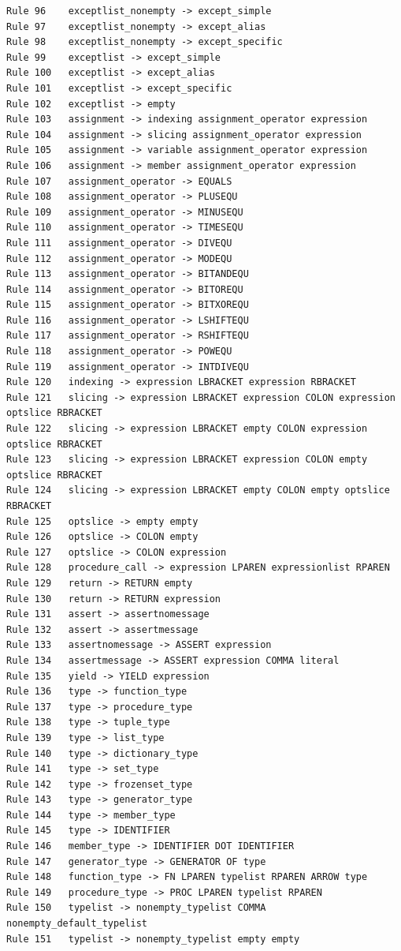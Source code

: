 \documentclass{article}
\begin{document}
\begin{verbatim}
Rule 96    exceptlist_nonempty -> except_simple
Rule 97    exceptlist_nonempty -> except_alias
Rule 98    exceptlist_nonempty -> except_specific
Rule 99    exceptlist -> except_simple
Rule 100   exceptlist -> except_alias
Rule 101   exceptlist -> except_specific
Rule 102   exceptlist -> empty
Rule 103   assignment -> indexing assignment_operator expression
Rule 104   assignment -> slicing assignment_operator expression
Rule 105   assignment -> variable assignment_operator expression
Rule 106   assignment -> member assignment_operator expression
Rule 107   assignment_operator -> EQUALS
Rule 108   assignment_operator -> PLUSEQU
Rule 109   assignment_operator -> MINUSEQU
Rule 110   assignment_operator -> TIMESEQU
Rule 111   assignment_operator -> DIVEQU
Rule 112   assignment_operator -> MODEQU
Rule 113   assignment_operator -> BITANDEQU
Rule 114   assignment_operator -> BITOREQU
Rule 115   assignment_operator -> BITXOREQU
Rule 116   assignment_operator -> LSHIFTEQU
Rule 117   assignment_operator -> RSHIFTEQU
Rule 118   assignment_operator -> POWEQU
Rule 119   assignment_operator -> INTDIVEQU
Rule 120   indexing -> expression LBRACKET expression RBRACKET
Rule 121   slicing -> expression LBRACKET expression COLON expression optslice RBRACKET
Rule 122   slicing -> expression LBRACKET empty COLON expression optslice RBRACKET
Rule 123   slicing -> expression LBRACKET expression COLON empty optslice RBRACKET
Rule 124   slicing -> expression LBRACKET empty COLON empty optslice RBRACKET
Rule 125   optslice -> empty empty
Rule 126   optslice -> COLON empty
Rule 127   optslice -> COLON expression
Rule 128   procedure_call -> expression LPAREN expressionlist RPAREN
Rule 129   return -> RETURN empty
Rule 130   return -> RETURN expression
Rule 131   assert -> assertnomessage
Rule 132   assert -> assertmessage
Rule 133   assertnomessage -> ASSERT expression
Rule 134   assertmessage -> ASSERT expression COMMA literal
Rule 135   yield -> YIELD expression
Rule 136   type -> function_type
Rule 137   type -> procedure_type
Rule 138   type -> tuple_type
Rule 139   type -> list_type
Rule 140   type -> dictionary_type
Rule 141   type -> set_type
Rule 142   type -> frozenset_type
Rule 143   type -> generator_type
Rule 144   type -> member_type
Rule 145   type -> IDENTIFIER
Rule 146   member_type -> IDENTIFIER DOT IDENTIFIER
Rule 147   generator_type -> GENERATOR OF type
Rule 148   function_type -> FN LPAREN typelist RPAREN ARROW type
Rule 149   procedure_type -> PROC LPAREN typelist RPAREN
Rule 150   typelist -> nonempty_typelist COMMA nonempty_default_typelist
Rule 151   typelist -> nonempty_typelist empty empty

\end{verbatim}
\end{document}
